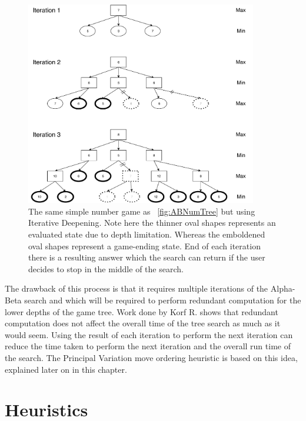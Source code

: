 \documentclass{l4proj}
\begin{document}
\begin{figure}[!ht]
\centering
\includegraphics[width=0.9\textwidth]{ABNumIDeep.pdf}
\caption{ The same simple number game as ~\autoref{fig:ABNumTree} but using Iterative Deepening. Note here the thinner oval shapes represents an evaluated state due to depth limitation. Whereas the emboldened oval shapes represent a game-ending state. End of each iteration there is a resulting answer which the search can return if the user decides to stop in the middle of the search.}
\label{fig:iter-deep}
\end{figure}


The drawback of this process is that it requires multiple iterations of the Alpha-Beta search and which will be required to perform redundant computation for the lower depths of the game tree. Work done by Korf R. \cite{Korf1985} shows that redundant computation does not affect the overall time of the tree search as much as it would seem. Using the result of each iteration to perform the next iteration can reduce the time taken to perform the next iteration and the overall run time of the search. The Principal Variation move ordering heuristic is based on this idea, explained later on in this chapter.




\section{Heuristics}
\end{document}
